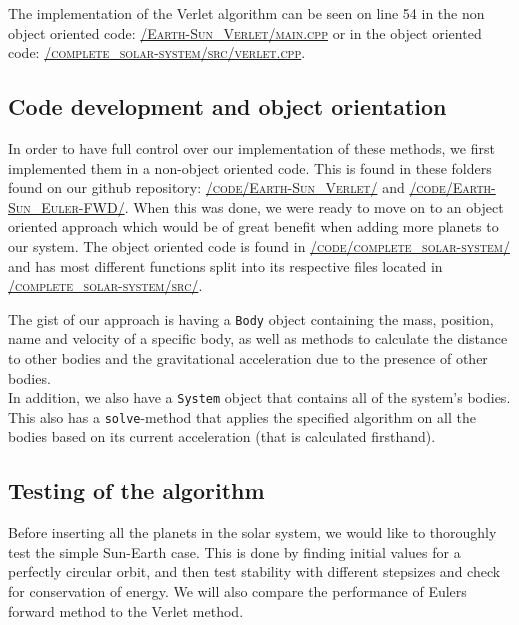 \documentclass[../main.tex]{subfiles}
\begin{document}
The implementation of the Verlet algorithm can be seen on line 54 in the non object oriented code: \href{https://github.com/kmaasrud/Project-5/blob/master/code/Earth-Sun_Verlet/main.cpp}{\textsc{/Earth-Sun\_Verlet/main.cpp}} or in the object oriented code: \href{https://github.com/kmaasrud/Project-5/blob/master/code/complete_solar-system/src/verlet.cpp}{\textsc{/complete\_solar-system/src/verlet.cpp}}.


\subsection{Code development and object orientation}
In order to have full control over our implementation of these methods, we first implemented them in a non-object oriented code. This is found in these folders found on our github repository\cite{repository}: \href{https://github.com/kmaasrud/Project-5/blob/master/code/Earth-Sun_Verlet/}{\textsc{/code/Earth-Sun\_Verlet/}} and \href{https://github.com/kmaasrud/Project-5/blob/master/code/Earth-Sun_Euler-FWD/}{\textsc{/code/Earth-Sun\_Euler-FWD/}}. When this was done, we were ready to move on to an object oriented approach which would be of great benefit when adding more planets to our system.
The object oriented code is found in \href{https://github.com/kmaasrud/Project-5/blob/master/code/complete_solar-system/}{\textsc{/code/complete\_solar-system/}} and has most different functions split into its respective files located in \href{https://github.com/kmaasrud/Project-5/blob/master/code/complete_solar-system/src/}{\textsc{/complete\_solar-system/src/}}.

The gist of our approach is having a \verb+Body+ object containing the mass, position, name and velocity of a specific body, as well as methods to calculate the distance to other bodies and the gravitational acceleration due to the presence of other bodies. \\
In addition, we also have a \verb+System+ object that contains all of the system's bodies. This also has a \verb+solve+-method that applies the specified algorithm on all the bodies based on its current acceleration (that is calculated firsthand). \\


\subsection{Testing of the algorithm}
Before inserting all the planets in the solar system, we would like to thoroughly test the simple Sun-Earth case. This is done by finding initial values for a perfectly circular orbit, and then test stability with different stepsizes and check for conservation of energy. We will also compare the performance of Eulers forward method to the Verlet method.
\end{document}
